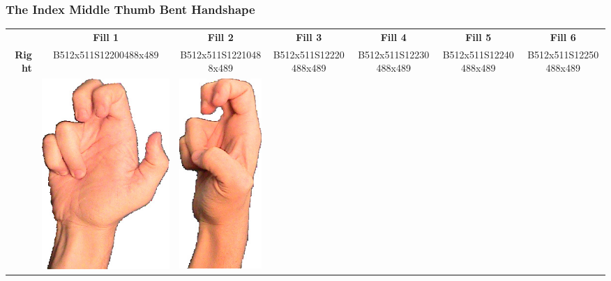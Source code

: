 \documentclass{article}
\begin{document}
\subsubsection{The Index Middle Thumb Bent Handshape}

\begin{center}
\begin{tabular}{r*{6}{c}}
&\textbf{Fill 1}&\textbf{Fill 2}&\textbf{Fill 3}&\textbf{Fill 4}&\textbf{Fill 5}&\textbf{Fill 6}\\
\multirow{2}{*}{\textbf{Right}}&
B512x511S12200488x489&
B512x511S12210488x489&
B512x511S12220488x489&
B512x511S12230488x489&
B512x511S12240488x489&
B512x511S12250488x489\\
&
\includegraphics[scale=0.1]{images/03-03-1.jpg}&
\includegraphics[scale=0.1]{images/03-03-2.jpg}&

\end{tabular}
\end{center}
\end{document}

